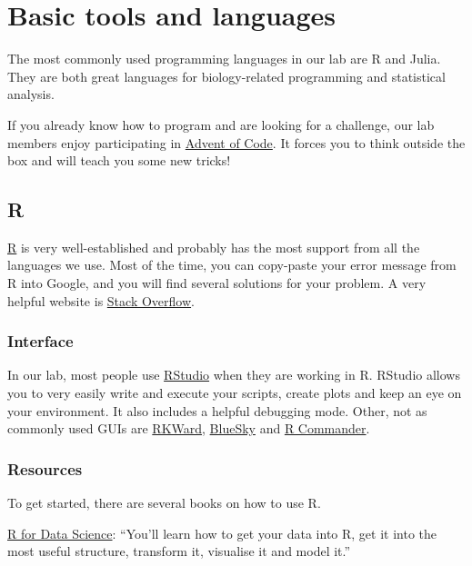 \documentclass[
]{book}
\begin{document}
\section{Basic tools and languages}\label{basic-tools-and-languages}

The most commonly used programming languages in our lab are R and Julia.
They are both great languages for biology-related programming and
statistical analysis.

If you already know how to program and are looking for a challenge, our
lab members enjoy participating in \href{https://adventofcode.com/}{Advent of
Code}. It forces you to think outside the box
and will teach you some new tricks!

\subsection{R}\label{r}

\href{https://www.r-project.org/}{R} is very well-established and probably
has the most support from all the languages we use. Most of the time,
you can copy-paste your error message from R into Google, and you will
find several solutions for your problem. A very helpful website is
\href{https://stackoverflow.com/}{Stack Overflow}.

\subsubsection{Interface}\label{interface}

In our lab, most people use \href{https://www.rstudio.com/}{RStudio} when
they are working in R. RStudio allows you to very easily write and
execute your scripts, create plots and keep an eye on your environment.
It also includes a helpful debugging mode. Other, not as commonly used
GUIs are \href{https://rkward.kde.org/}{RKWard},
\href{https://www.blueskystatistics.com/Default.asp}{BlueSky} and \href{https://socialsciences.mcmaster.ca/jfox/Misc/Rcmdr/}{R
Commander}.

\subsubsection{Resources}\label{resources}

To get started, there are several books on how to use R.

\href{https://r4ds.had.co.nz/}{R for Data Science}: ``You'll learn how to get
your data into R, get it into the most useful structure, transform it,
visualise it and model it.''
\end{document}
